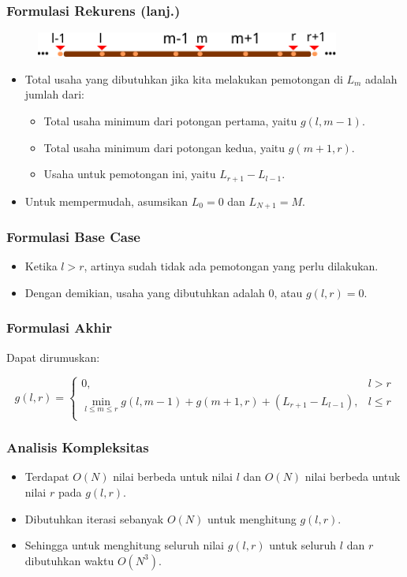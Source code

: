 \begin{frame}
\frametitle{Formulasi Rekurens (lanj.)}
\begin{figure}
  \includegraphics[width=10cm]{asset/cutting-stick-4.pdf}
\end{figure}
\begin{itemize}
  \item Total usaha yang dibutuhkan jika kita melakukan pemotongan di $L_m$ adalah jumlah dari:
  \begin{itemize}
    \item Total usaha minimum dari potongan pertama, yaitu $g(l,m-1)$.
    \item Total usaha minimum dari potongan kedua, yaitu $g(m+1,r)$.
    \item Usaha untuk pemotongan ini, yaitu $L_{r+1} - L_{l-1}$.
  \end{itemize}
  \item Untuk mempermudah, asumsikan $L_0 = 0$ dan $L_{N+1} = M$.
\end{itemize}
\end{frame}

\begin{frame} 
\frametitle{Formulasi Base Case}
\begin{itemize}
  \item Ketika $l>r$, artinya sudah tidak ada pemotongan yang perlu dilakukan.
  \item Dengan demikian, usaha yang dibutuhkan adalah 0, atau $g(l,r) = 0$.
\end{itemize}
\end{frame}

\begin{frame} 
\frametitle{Formulasi Akhir}
Dapat dirumuskan:
\begin{small}
\[g(l,r) = \left\{\begin{array}{lr}
    0, & l>r\\
    \min_{l \leq m \leq r} g(l,m-1) + g(m+1,r) + (L_{r+1} - L_{l-1}), & l \leq r \\
    \end{array}\right.\]
\end{small}
\end{frame}

\begin{frame} 
\frametitle{Analisis Kompleksitas}
\begin{itemize}
  \item Terdapat $O(N)$ nilai berbeda untuk nilai $l$ dan $O(N)$ nilai berbeda untuk nilai $r$ pada $g(l,r)$.
  \item Dibutuhkan iterasi sebanyak $O(N)$ untuk menghitung $g(l,r)$. 
  \item Sehingga untuk menghitung seluruh nilai $g(l,r)$ untuk seluruh $l$ dan $r$ dibutuhkan waktu $O(N^3)$.
\end{itemize}
\end{frame}


